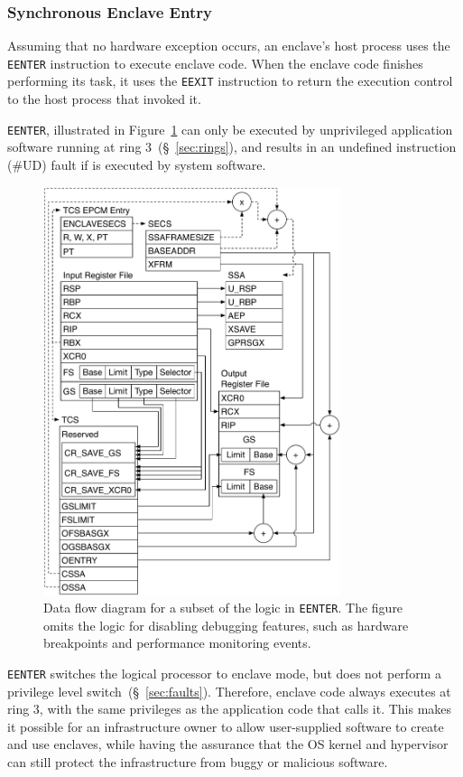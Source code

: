 \subsubsection{Synchronous Enclave Entry}
\label{sec:sgx_enclave_mode}
\label{sec:sgx_eenter}

Assuming that no hardware exception occurs, an enclave's host process uses the
\texttt{EENTER} instruction to execute enclave code. When the enclave code
finishes performing its task, it uses the \texttt{EEXIT} instruction to return
the execution control to the host process that invoked it.


\texttt{EENTER}, illustrated in Figure~\ref{fig:sgx_eenter} can only be
executed by unprivileged application software running at ring
3~(\S~\ref{sec:rings}), and results in an undefined instruction (\#UD) fault if
is executed by system software.

\begin{figure}[hbt]
  \centering
  \includegraphics[width=87mm]{figures/sgx_eenter.pdf}
  \caption{
    Data flow diagram for a subset of the logic in \texttt{EENTER}. The figure
    omits the logic for disabling debugging features, such as hardware
    breakpoints and performance monitoring events.
  }
  \label{fig:sgx_eenter}
\end{figure}

\texttt{EENTER} switches the logical processor to enclave mode, but does not
perform a privilege level switch~(\S~\ref{sec:faults}). Therefore, enclave code
always executes at ring 3, with the same privileges as the application code
that calls it. This makes it possible for an infrastructure owner to allow
user-supplied software to create and use enclaves, while having the assurance
that the OS kernel and hypervisor can still protect the infrastructure from
buggy or malicious software.

